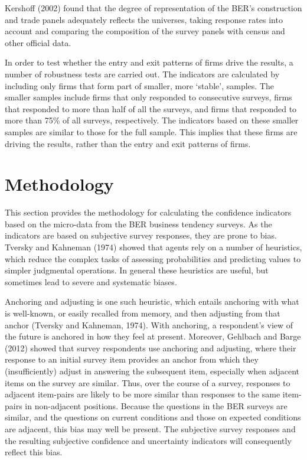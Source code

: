 \documentclass[11pt,]{article}
\begin{document}
Kershoff (2002) found that the degree of representation of the BER's
construction and trade panels adequately reflects the universes, taking
response rates into account and comparing the composition of the survey
panels with census and other official data.

In order to test whether the entry and exit patterns of firms drive the
results, a number of robustness tests are carried out. The indicators
are calculated by including only firms that form part of smaller, more
`stable', samples. The smaller samples include firms that only responded
to consecutive surveys, firms that responded to more than half of all
the surveys, and firms that responded to more than 75\% of all surveys,
respectively. The indicators based on these smaller samples are similar
to those for the full sample. This implies that these firms are driving
the results, rather than the entry and exit patterns of firms.

\section{Methodology}\label{methodology}

This section provides the methodology for calculating the confidence
indicators based on the micro-data from the BER business tendency
surveys. As the indicators are based on subjective survey responses,
they are prone to bias. Tversky and Kahneman (1974) showed that agents
rely on a number of heuristics, which reduce the complex tasks of
assessing probabilities and predicting values to simpler judgmental
operations. In general these heuristics are useful, but sometimes lead
to severe and systematic biases.

Anchoring and adjusting is one such heuristic, which entails anchoring
with what is well-known, or easily recalled from memory, and then
adjusting from that anchor (Tversky and Kahneman, 1974). With anchoring,
a respondent's view of the future is anchored in how they feel at
present. Moreover, Gehlbach and Barge (2012) showed that survey
respondents use anchoring and adjusting, where their response to an
initial survey item provides an anchor from which they (insufficiently)
adjust in answering the subsequent item, especially when adjacent items
on the survey are similar. Thus, over the course of a survey, responses
to adjacent item-pairs are likely to be more similar than responses to
the same item-pairs in non-adjacent positions. Because the questions in
the BER surveys are similar, and the questions on current conditions and
those on expected conditions are adjacent, this bias may well be
present. The subjective survey responses and the resulting subjective
confidence and uncertainty indicators will consequently reflect this
bias.
\end{document}
